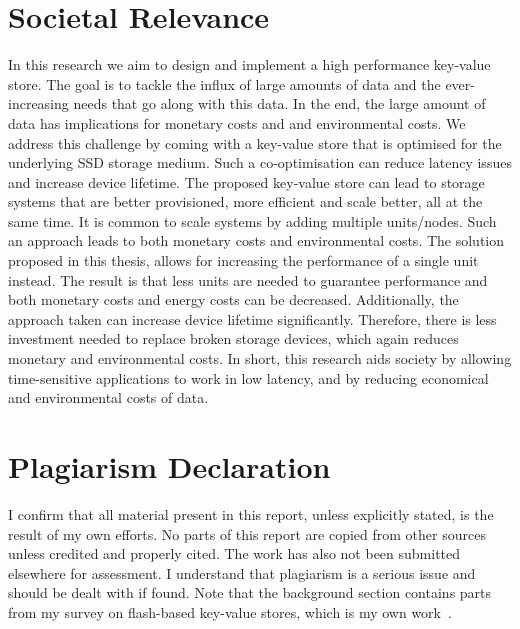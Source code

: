 \section{Societal Relevance}
In this research we aim to design and implement a high performance key-value store. The goal is to tackle the influx of large amounts of data and the ever-increasing needs that go along with this data. In the end, the large amount of data has implications for monetary costs and and environmental costs\cite{iosup2022future}. We address this challenge by coming with a key-value store that is optimised for the underlying SSD storage medium. Such a co-optimisation can reduce latency issues and increase device lifetime. The proposed key-value store can lead to storage systems that are better provisioned, more efficient and scale better, all at the same time. It is common to scale systems by adding multiple units/nodes\cite{li2013distributed,escriva2012hyperdex,cao2020polardb}. Such an approach leads to both monetary costs and environmental costs. The solution proposed in this thesis, allows for increasing the performance of a single unit instead. The result is that less units are needed to guarantee performance and both monetary costs and energy costs can be decreased. Additionally, the approach taken can increase device lifetime significantly. Therefore, there is less investment needed to replace broken storage devices, which again reduces monetary and environmental costs. In short, this research aids society by allowing time-sensitive applications to work in low latency, and by reducing economical and environmental costs of data.

\section*{Plagiarism Declaration}
I confirm that all material present in this report, unless explicitly stated, is the result of my own efforts. No parts of this report are copied from other sources unless credited and properly cited. The work has also not been submitted elsewhere for assessment. I understand that plagiarism is a serious issue and should be dealt with if found. Note that the background section contains parts from my survey on flash-based key-value stores, which is my own work~\cite{doekemeijer2022key}.